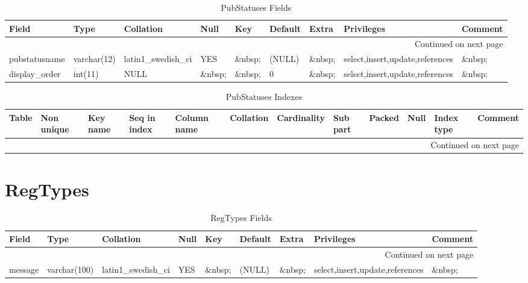\documentclass[tablesignature,landscape]{scrartcl}
\begin{document}
\begin{longtable}{|l|l|l|l|l|l|l|l|l|}
\caption{PubStatuses Fields} \label{tbl:pubsttausesfields}\\
\hline
 Field             &  Type         &  Collation                &  Null     &  Key      &  Default  &  Extra              &  Privileges                       &  Comment \\
\hline
\endhead
\hline\multicolumn{9}{r}{Continued on next page}\
\endfoot
\endlastfoot
\hline
 pubstatusid       &  int(11)      &  NULL                     &  \&nbsp;  &  PRI      &  (NULL)   &  auto\_{}increment  &  select,insert,update,references  &  \&nbsp;  \\
 pubstatusname     &  varchar(12)  &  latin1\_{}swedish\_{}ci  &  YES      &  \&nbsp;  &  (NULL)   &  \&nbsp;            &  select,insert,update,references  &  \&nbsp;  \\
 display\_{}order  &  int(11)      &  NULL                     &  \&nbsp;  &  \&nbsp;  &  0        &  \&nbsp;            &  select,insert,update,references  &  \&nbsp;  \\
\hline
\end{longtable}


\begin{longtable}{|l|l|l|l|l|l|l|l|l|l|l|l|}
\caption{PubStatuses Indexes} \label{tbl:pubstatusesindexes}\\
\hline
 Table        &  Non unique  &  Key name  &  Seq in index  &  Column name  &  Collation  &  Cardinality  &  Sub part  &  Packed  &  Null     &  Index type  &  Comment \\
\hline
\endhead
\hline\multicolumn{12}{r}{Continued on next page}\
\endfoot
\endlastfoot
\hline
 PubStatuses  &           0  &  PRIMARY   &             1  &  pubstatusid  &  A          &            3  &  (NULL)    &  (NULL)  &  \&nbsp;  &  BTREE       &  \&nbsp;  \\
\hline
\end{longtable}
\section{RegTypes}
\label{sec-19}


\begin{longtable}{|l|l|l|l|l|l|l|l|l|}
\caption{RegTypes Fields} \label{tbl:regtypesfields}\\
\hline
 Field    &  Type          &  Collation                &  Null     &  Key      &  Default  &  Extra    &  Privileges                       &  Comment \\
\hline
\endhead
\hline\multicolumn{9}{r}{Continued on next page}\
\endfoot
\endlastfoot
\hline
 regtype  &  varchar(40)   &  latin1\_{}swedish\_{}ci  &  \&nbsp;  &  PRI      &  \&nbsp;  &  \&nbsp;  &  select,insert,update,references  &  \&nbsp;  \\
 message  &  varchar(100)  &  latin1\_{}swedish\_{}ci  &  YES      &  \&nbsp;  &  (NULL)   &  \&nbsp;  &  select,insert,update,references  &  \&nbsp;  \\
\hline
\end{longtable}
\end{document}
